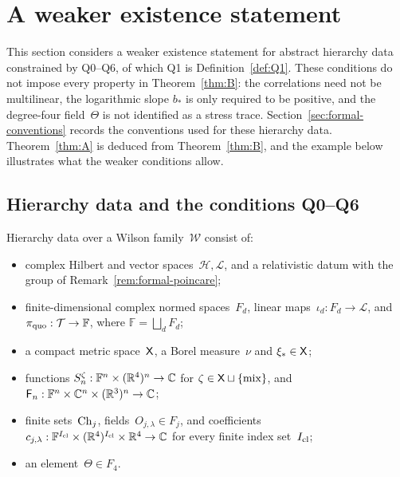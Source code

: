 \section{A weaker existence statement}\label{sec:correspondence}

This section considers a weaker existence statement for abstract hierarchy data constrained by Q0--Q6, of which Q1 is Definition~\ref{def:Q1}. These conditions do not impose every property in Theorem~\ref{thm:B}: the correlations need not be multilinear, the logarithmic slope $b_*$ is only required to be positive, and the degree-four field~$\Theta$ is not identified as a stress trace. Section~\ref{sec:formal-conventions} records the conventions used for these hierarchy data. Theorem~\ref{thm:A} is deduced from Theorem~\ref{thm:B}, and the example below illustrates what the weaker conditions allow.

\subsection{Hierarchy data and the conditions Q0--Q6}\label{sec:hierarchy-data}

\begin{definition}\label{def:Q0}
Hierarchy data over a Wilson family~$\mathcal W$ consist of:
\begin{itemize}[nosep]
\item complex Hilbert and vector spaces~$\mathcal H,\mathcal L$, and a relativistic datum with the group of Remark~\ref{rem:formal-poincare};
\item finite-dimensional complex normed spaces~$F_d$, linear maps~$\iota_d:F_d\to\mathcal L$, and $\pi_{\rm quo}:\mathcal T\to\mathbb F$, where $\mathbb F=\bigsqcup_dF_d$;
\item a compact metric space~$\mathsf{X}$, a Borel measure~$\nu$ and $\xi_*\in\mathsf{X}$;
\item functions $S_n^\zeta:\mathbb F^n\times(\mathbb{R}^4)^n\to\mathbb{C}$ for $\zeta\in\mathsf{X}\sqcup\{\mathrm{mix}\}$, and $\mathsf F_n:\mathbb F^n\times\mathbb{C}^n\times(\mathbb{R}^3)^n\to\mathbb{C}$;
\item finite sets~$\mathrm{Ch}_{j}$, fields~$O_{j,\lambda}\in F_j$, and coefficients $c_{j,\lambda}:\mathbb F^{I_{\rm cl}}\times(\mathbb{R}^4)^{I_{\rm cl}}\times\mathbb{R}^4\to\mathbb{C}$ for every finite index set~$I_{\rm cl}$;
\item an element~$\Theta\in F_4$.
\end{itemize}
\end{definition}

